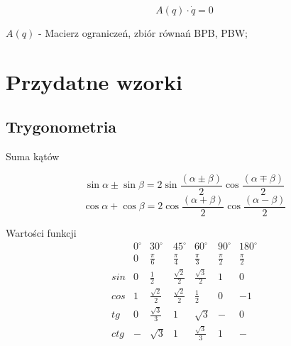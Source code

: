 \documentclass{article}
\newenvironment{kol2}{\noindent \begin{minipage}[t]{0.5\linewidth}}{\end{minipage}}
\begin{document}
\Large
$$ A(q) \cdot \dot{q} = 0 $$
\normalsize

\vspace{0.5cm}
\large
$ A(q) $ - Macierz ograniczeń, zbiór równań BPB, PBW;
\normalsize

\newpage

\section{Przydatne wzorki}
\subsection{Trygonometria}

\begin{kol2}

    \noindent
    Suma kątów

    $$  \sin{\alpha}\pm\sin{\beta}=
        2\sin{\frac{\left(\alpha\pm\beta\right)}{2}}
        \cos{\frac{\left(\alpha\mp\beta\right)}{2}} $$
    $$  \cos{\alpha}+\cos{\beta}=
        2\cos{\frac{\left(\alpha+\beta\right)}{2}}
        \cos{\frac{\left(\alpha-\beta\right)}{2}} $$
\end{kol2}
\begin{kol2}

    \noindent
    Wartości funkcji\textbf{}
    $$
        \begin{array}{c|c|c|c|c|c|c}
                & 0^\circ & 30^\circ       & 45^\circ       & 60^\circ       & 90^\circ  & 180^\circ \\
                & 0       & \frac\pi6      & \frac\pi4      & \frac{\pi}3    & \frac\pi2 & \frac\pi2 \\ \hline
            sin & 0       & \frac12        & \frac{\sqrt2}2 & \frac{\sqrt3}2 & 1         & 0         \\
            cos & 1       & \frac{\sqrt2}2 & \frac{\sqrt2}2 & \frac12        & 0         & -1        \\ \hline
            tg  & 0       & \frac{\sqrt3}3 & 1              & \sqrt3         & -         & 0         \\
            ctg & -       & \sqrt3         & 1              & \frac{\sqrt3}3 & 1         & -         \\
        \end{array}
    $$
\end{kol2}
\end{document}
